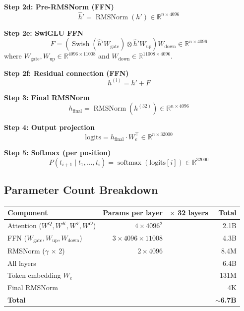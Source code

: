\documentclass[11pt,a4paper]{article}
\newcommand{\R}{\mathbb{R}}
\newcommand{\softmax}{\operatorname{softmax}}
\newcommand{\RMSNorm}{\operatorname{RMSNorm}}
\newcommand{\Swish}{\operatorname{Swish}}
\begin{document}
\noindent\textbf{Step 2d: Pre-RMSNorm (FFN)}
\begin{equation}
  \hat{h}' = \RMSNorm(h') \in \R^{n \times 4096}
\end{equation}

\noindent\textbf{Step 2e: SwiGLU FFN}
\begin{equation}
  F = \left(\Swish(\hat{h}' W_{\text{gate}}) \otimes \hat{h}' W_{\text{up}}\right) W_{\text{down}}
  \in \R^{n \times 4096}
\end{equation}
where $W_{\text{gate}}, W_{\text{up}} \in \R^{4096 \times 11008}$ and
$W_{\text{down}} \in \R^{11008 \times 4096}$.

\noindent\textbf{Step 2f: Residual connection (FFN)}
\begin{equation}
  h^{(l)} = h' + F
\end{equation}

\medskip

\noindent\textbf{Step 3: Final RMSNorm}
\begin{equation}
  h_{\text{final}} = \RMSNorm(h^{(32)}) \in \R^{n \times 4096}
\end{equation}

\noindent\textbf{Step 4: Output projection}
\begin{equation}
  \text{logits} = h_{\text{final}} \cdot W_e^\top \in \R^{n \times 32000}
\end{equation}

\noindent\textbf{Step 5: Softmax (per position)}
\begin{equation}
  P(t_{i+1} \mid t_1, \ldots, t_i) = \softmax(\text{logits}[i]) \in \R^{32000}
\end{equation}

\subsection{Parameter Count Breakdown}

\begin{center}
\begin{tabular}{lrrr}
\toprule
\textbf{Component} & \textbf{Params per layer} & \textbf{$\times$ 32 layers} & \textbf{Total} \\
\midrule
Attention ($W^Q, W^K, W^V, W^O$) & $4 \times 4096^2$ & & 2.1B \\
FFN ($W_{\text{gate}}, W_{\text{up}}, W_{\text{down}}$) & $3 \times 4096 \times 11008$ & & 4.3B \\
RMSNorm ($\gamma$ $\times$ 2) & $2 \times 4096$ & & 8.4M \\
\midrule
All layers & & & 6.4B \\
Token embedding $W_e$ & & & 131M \\
Final RMSNorm & & & 4K \\
\midrule
\textbf{Total} & & & $\sim$\textbf{6.7B} \\
\bottomrule
\end{tabular}
\end{center}
\end{document}
